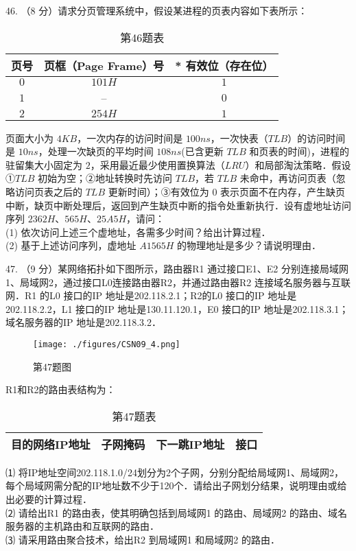 46. （8 分）请求分页管理系统中，假设某进程的页表内容如下表所示：
\begin{table}[ht]
\centering
\caption{第46题表}\label{CSN09_tab3}
\begin{tabular}{|c|c|c|}
\hline
页号 & 页框（Page Frame）号 & * 有效位（存在位） \\
\hline
$0$ & $101H$ & $1$ \\
\hline
$1$ & -- & $0$ \\
\hline
$2$ & $254H$ & $1$ \\
\hline
\end{tabular}
\end{table}
页面大小为 $4KB$，一次内存的访问时间是 $100ns$，一次快表（$TLB$）的访问时间是 $10ns$，处理一次缺页的平均时间 $108ns$(已含更新 $TLB$ 和页表的时间)，进程的驻留集大小固定为 $2$，采用最近最少使用置换算法（$LRU$）和局部淘汰策略．假设①$TLB$ 初始为空；②地址转换时先访问 $TLB$，若 $TLB$ 未命中，再访问页表（忽略访问页表之后的 $TLB$ 更新时间）；③有效位为 $0$ 表示页面不在内存，产生缺页中断，缺页中断处理后，返回到产生缺页中断的指令处重新执行．设有虚地址访问序列 $2362H$、$565H$、$25A5H$，请问： \\
(1) 依次访问上述三个虚地址，各需多少时间？给出计算过程． \\
(2) 基于上述访问序列，虚地址 $A1565H$ 的物理地址是多少？请说明理由．

47. （9 分）某网络拓扑如下图所示，路由器R1 通过接口E1、E2 分别连接局域网1、局域网2，通过接口L0连接路由器R2，并通过路由器R2 连接域名服务器与互联网．R1 的L0 接口的IP 地址是202.118.2.1；R2的L0 接口的IP 地址是202.118.2.2，L1 接口的IP 地址是130.11.120.1，E0 接口的IP 地址是202.118.3.1；域名服务器的IP 地址是202.118.3.2．
\begin{figure}[ht]
\centering
\texttt{[image: ./figures/CSN09\_4.png]}
\caption{第47题图} \label{CSN09_fig4}
\end{figure}
R1和R2的路由表结构为： \\
\begin{table}[ht]
\centering
\caption{第47题表}\label{CSN09_tab4}
\begin{tabular}{|c|c|c|c|}
\hline
目的网络IP地址 & 子网掩码 & 下一跳IP地址 & 接口 \\
\hline
\end{tabular}
\end{table}
⑴ 将IP地址空间202.118.1.0/24划分为2个子网，分别分配给局域网1、局域网2，每个局域网需分配的IP地址数不少于120个．请给出子网划分结果，说明理由或给出必要的计算过程． \\
⑵ 请给出R1 的路由表，使其明确包括到局域网1 的路由、局域网2 的路由、域名服务器的主机路由和互联网的路由． \\
⑶ 请采用路由聚合技术，给出R2 到局域网1 和局域网2 的路由．

